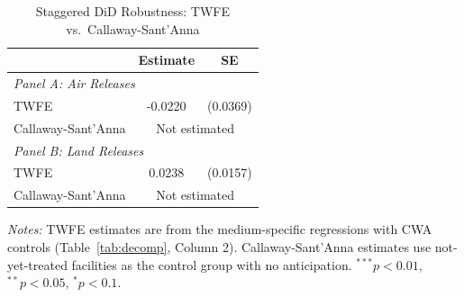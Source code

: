 \begin{table}[htbp]
\centering
\caption{Staggered DiD Robustness: TWFE vs.\ Callaway-Sant'Anna}
\label{tab:cs}
\begin{tabular}{lcc}
\toprule
& Estimate & SE \\
\midrule
\multicolumn{3}{l}{\textit{Panel A: Air Releases}} \\[3pt]
TWFE & -0.0220 & (0.0369) \\
Callaway-Sant'Anna & \multicolumn{2}{c}{Not estimated} \\
\midrule
\multicolumn{3}{l}{\textit{Panel B: Land Releases}} \\[3pt]
TWFE & 0.0238 & (0.0157) \\
Callaway-Sant'Anna & \multicolumn{2}{c}{Not estimated} \\

\bottomrule
\end{tabular}
\begin{minipage}{0.95\textwidth}
\vspace{0.3em}
\footnotesize \textit{Notes:} TWFE estimates are from the medium-specific regressions with CWA controls (Table~\ref{tab:decomp}, Column 2). Callaway-Sant'Anna estimates use not-yet-treated facilities as the control group with no anticipation. $^{***}p<0.01$, $^{**}p<0.05$, $^{*}p<0.1$.
\end{minipage}
\end{table}
